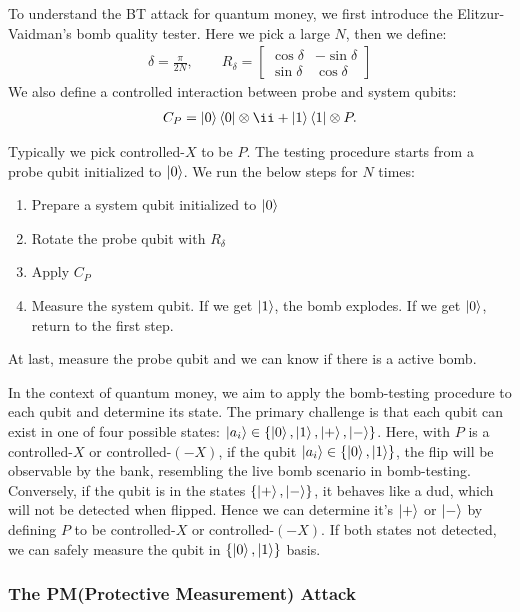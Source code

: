 \documentclass{article} %
\begin{document}
To understand the BT attack for quantum money, we first introduce the Elitzur-Vaidman’s bomb quality tester. Here we pick a large $N$, then we define:
\begin{align}
	\delta = \frac{\pi}{2N}, \qquad
	R_\delta = \begin{bmatrix}
	    \cos \delta&-\sin \delta\\\sin \delta&\cos \delta
	\end{bmatrix} \label{delta}
\end{align}
We also define a controlled interaction between probe and system qubits:
\begin{align}
	C_P = \ket{0}\bra{0} \otimes \ii + \ket{1}\bra{1} \otimes P. \label{probe}
\end{align}

Typically we pick controlled-$X$ to be $P$. The testing procedure starts from a probe qubit initialized to $\ket{0}$. We run the below steps for $N$ times:
\begin{enumerate}
    \item Prepare a system qubit initialized to $\ket{0}$
    \item Rotate the probe qubit with $R_\delta$
    \item Apply $C_P$
    \item Measure the system qubit. If we get $\ket{1}$, the bomb explodes. If we get $\ket{0}$, return to the first step.
\end{enumerate}

At last, measure the probe qubit and we can know if there is a active bomb.

In the context of quantum money, we aim to apply the bomb-testing procedure to each qubit and determine its state. The primary challenge is that each qubit can exist in one of four possible states: $\ket{a_i}\in\{\ket{0},\ket{1},\ket{+},\ket{-}\}$. 
Here, with $P$ is a controlled-$X$ or controlled-$(-X)$, if the qubit $\ket{a_i}\in\{\ket{0},\ket{1}\}$, the flip will be observable by the bank, resembling the live bomb scenario in bomb-testing. Conversely, if the qubit is in the states $ \{\ket{+}, \ket{-}\} $, it behaves like a dud, which will not be detected when flipped. Hence we can determine it's $\ket{+}$ or $\ket{-}$ by defining $P$ to be controlled-$X$ or controlled-$(-X)$. If both states not detected, we can safely measure the qubit in $\{\ket{0},\ket{1}\}$ basis.


\subsubsection{The PM(Protective Measurement) Attack}
\end{document}
